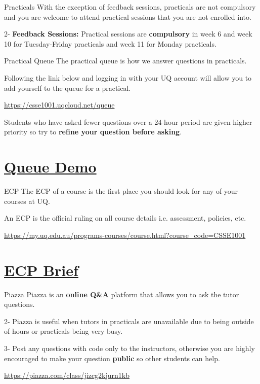 \documentclass[week2]{csse1001}
\begin{document}
\begin{topic}{Practicals}
With the exception of feedback sessions, practicals are not compulsory and you are welcome to attend practical sessions that you are not enrolled into.

\begin{subtopic}{2-}
\textbf{Feedback Sessions:} Practical sessions are \textbf{compulsory} in week 6 and week 10 for Tuesday-Friday practicals and week 11 for Monday practicals.
\end{subtopic}
\end{topic}

\begin{topic}{Practical Queue}
The practical queue is how we answer questions in practicals.

Following the link below and logging in with your UQ account will allow you to add yourself to the queue for a practical.

\url{https://csse1001.uqcloud.net/queue}

Students who have asked fewer questions over a 24-hour period are given higher priority so try to \textbf{refine your question before asking}.
\end{topic}

\section{\href{https://csse1001.uqcloud.net/queue}{Queue Demo}}

\begin{topic}{ECP}
The ECP of a course is the first place you should look for any of your courses at UQ.

An ECP is the official ruling on all course details i.e. assessment, policies, etc.

\url{https://my.uq.edu.au/programs-courses/course.html?course_code=CSSE1001}
\end{topic}

\section{\href{https://my.uq.edu.au/programs-courses/course.html?course_code=CSSE1001}{ECP Brief}}

\begin{topic}{Piazza}
Piazza is an \textbf{online Q\&A} platform that allows you to ask the tutor questions.

\begin{subtopic}{2-}
Piazza is useful when tutors in practicals are unavailable due to being outside of hours or practicals being very busy.
\end{subtopic}

\begin{subtopic}{3-}
Post any questions with code only to the instructors, otherwise you are highly encouraged to make your question \textbf{public} so other students can help.
\end{subtopic}

\url{https://piazza.com/class/jizcg2kjurn1kb}
\end{topic}
\end{document}
